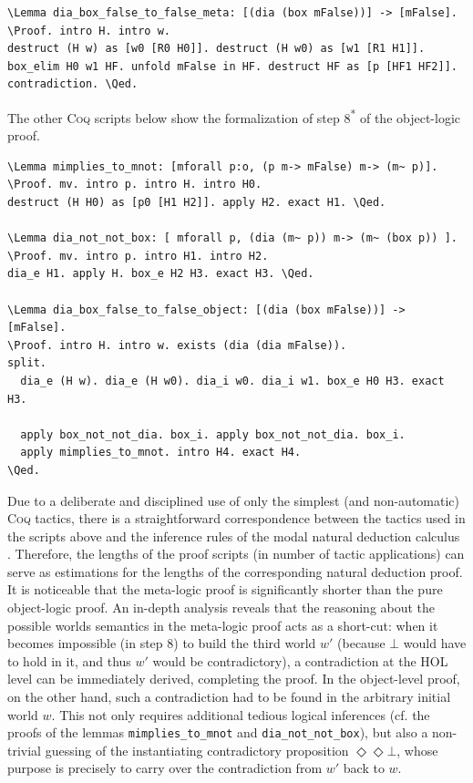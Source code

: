 \documentclass{llncs}
\newcommand{\red}[1]{\textcolor[rgb]{1,0,0}{#1}}
\newcommand{\blue}[1]{\textcolor[rgb]{0,0,1}{#1}}
\newcommand{\Lemma}{\red{Lemma}}
\newcommand{\Proof}{\blue{Proof}}
\newcommand{\Qed}{\blue{Qed}}
\newcommand{\verbsize}{\small}
\newcommand{\Dia}{\Diamond} %
\newcommand{\pos}{\Dia}
\begin{document}
\begin{Verbatim}[commandchars=\\\{\},fontsize=\verbsize]
\Lemma dia_box_false_to_false_meta: [(dia (box mFalse))] -> [mFalse].
\Proof. intro H. intro w.
destruct (H w) as [w0 [R0 H0]]. destruct (H w0) as [w1 [R1 H1]].
box_elim H0 w1 HF. unfold mFalse in HF. destruct HF as [p [HF1 HF2]].
contradiction. \Qed.
\end{Verbatim}

\noindent
The other \textsc{Coq} scripts below show the formalization of step 8\textsuperscript{*} of the object-logic proof.

\begin{Verbatim}[commandchars=\\\{\},fontsize=\verbsize]
\Lemma mimplies_to_mnot: [mforall p:o, (p m-> mFalse) m-> (m~ p)].
\Proof. mv. intro p. intro H. intro H0. 
destruct (H H0) as [p0 [H1 H2]]. apply H2. exact H1. \Qed.

\Lemma dia_not_not_box: [ mforall p, (dia (m~ p)) m-> (m~ (box p)) ].
\Proof. mv. intro p. intro H1. intro H2. 
dia_e H1. apply H. box_e H2 H3. exact H3. \Qed.

\Lemma dia_box_false_to_false_object: [(dia (box mFalse))] -> [mFalse].
\Proof. intro H. intro w. exists (dia (dia mFalse)).
split.
  dia_e (H w). dia_e (H w0). dia_i w0. dia_i w1. box_e H0 H3. exact H3.

  apply box_not_not_dia. box_i. apply box_not_not_dia. box_i.
  apply mimplies_to_mnot. intro H4. exact H4.
\Qed.
\end{Verbatim}

\noindent
Due to a deliberate and disciplined use of only 
the simplest (and non-automatic) \textsc{Coq} tactics, 
there is a straightforward correspondence between the tactics used 
in the scripts above and the inference rules of the modal natural 
deduction calculus \cite{CSR}. Therefore, the lengths of the proof 
scripts (in number of tactic applications) can serve as estimations 
for the lengths of the corresponding natural deduction proof. 
It is noticeable that the meta-logic proof is significantly shorter 
than the pure object-logic proof. An in-depth analysis 
reveals that the reasoning about the possible worlds semantics in 
the meta-logic proof acts as a short-cut: when it becomes impossible (in step 8) to build the third world $w'$ (because $\bot$ would have to hold in it, and thus $w'$ would be contradictory), a contradiction at the HOL level can be immediately derived, completing the proof. In the object-level proof, on the other hand, such a contradiction had to be found in the arbitrary initial world $w$. This not only requires additional tedious logical inferences (cf. the proofs of the lemmas \texttt{mimplies\_to\_mnot} and \texttt{dia\_not\_not\_box}), but also a non-trivial guessing of the instantiating contradictory proposition $\pos \pos \bot$, whose purpose is precisely to carry over the contradiction from $w'$ back to $w$.
\end{document}
